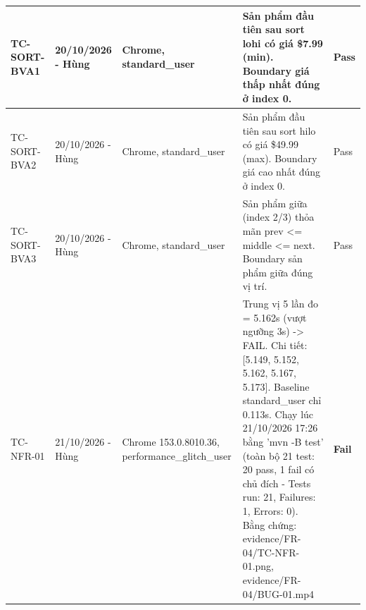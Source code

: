 {\begin{longtable}{|L{3.4cm}|L{2.6cm}|L{2.6cm}|L{4.7cm}|L{1.4cm}|}
\hline
\mbox{TC-SORT-BVA1} & 20/10/2026 - Hùng & Chrome, standard\_\allowbreak{}user & Sản phẩm đầu tiên sau sort lohi có giá \$7.99 (min). Boundary giá thấp nhất đúng ở index 0. & \textcolor{passgreen}{Pass} \\
\hline
\mbox{TC-SORT-BVA2} & 20/10/2026 - Hùng & Chrome, standard\_\allowbreak{}user & Sản phẩm đầu tiên sau sort hilo có giá \$49.99 (max). Boundary giá cao nhất đúng ở index 0. & \textcolor{passgreen}{Pass} \\
\hline
\mbox{TC-SORT-BVA3} & 20/10/2026 - Hùng & Chrome, standard\_\allowbreak{}user & Sản phẩm giữa (index 2/3) thỏa mãn prev <= middle <= next. Boundary sản phẩm giữa đúng vị trí. & \textcolor{passgreen}{Pass} \\
\hline
\mbox{TC-NFR-01} & 21/10/2026 - Hùng & Chrome 153.0.8010.36, performance\_\allowbreak{}glitch\_\allowbreak{}user & Trung vị 5 lần đo = 5.162s (vượt ngưỡng 3s) -> FAIL. Chi tiết: [5.149, 5.152, 5.162, 5.167, 5.173]. Baseline standard\_\allowbreak{}user chỉ 0.113s. Chạy lúc 21/10/2026 17:26 bằng 'mvn -B test' (toàn bộ 21 test: 20 pass, 1 fail có chủ đích - Tests run: 21, Failures: 1, Errors: 0). Bằng chứng: evidence/FR-04/\mbox{TC-NFR-01}.png, evidence/FR-04/BUG-01.mp4 & \textcolor{failred}{\textbf{Fail}} \\
\hline
\end{longtable}
}
